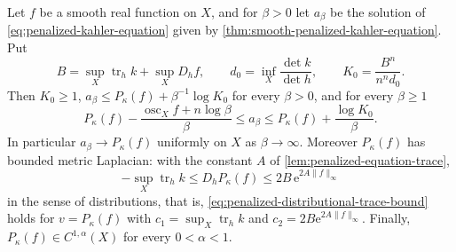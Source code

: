 \begin{proposition}\label{prop:penalized-envelope-uniform-limit}
Let $f$ be a smooth real function on $X$, and for $\beta>0$ let $a_\beta$ be the solution of \eqref{eq:penalized-kahler-equation} given by \cref{thm:smooth-penalized-kahler-equation}. Put
\[
 B=\sup_X\operatorname{tr}_hk+\sup_XD_hf,\qquad
 d_0=\inf_X\frac{\det k}{\det h},\qquad
 K_0=\frac{B^n}{n^nd_0}.
\]
Then $K_0\geq1$, $a_\beta\leq P_\kappa(f)+\beta^{-1}\log K_0$ for every $\beta>0$, and for every $\beta\geq1$
\[
 P_\kappa(f)-\frac{\operatorname{osc}_Xf+n\log\beta}{\beta}
  \leq a_\beta
  \leq P_\kappa(f)+\frac{\log K_0}{\beta}.
\]
In particular $a_\beta\to P_\kappa(f)$ uniformly on $X$ as $\beta\to\infty$. Moreover $P_\kappa(f)$ has bounded metric Laplacian: with the constant $A$ of \cref{lem:penalized-equation-trace},
\begin{equation}\label{eq:penalized-envelope-laplacian-bound}
 -\sup_X\operatorname{tr}_hk\leq D_hP_\kappa(f)\leq2B\,\mathrm e^{2A\|f\|_\infty}
\end{equation}
in the sense of distributions, that is, \eqref{eq:penalized-distributional-trace-bound} holds for $v=P_\kappa(f)$ with $c_1=\sup_X\operatorname{tr}_hk$ and $c_2=2B\mathrm e^{2A\|f\|_\infty}$. Finally, $P_\kappa(f)\in C^{1,\alpha}(X)$ for every $0<\alpha<1$.
\end{proposition}
